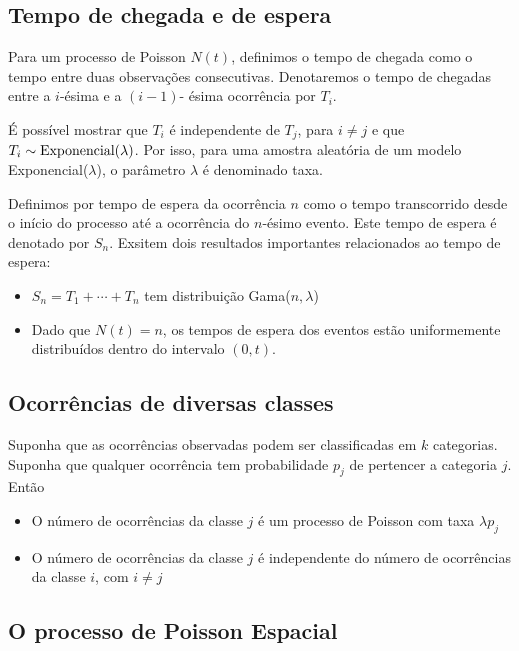 \documentclass[
  letterpaper,
  DIV=11,
  numbers=noendperiod]{scrreprt}
\theoremstyle{definition}
\theoremstyle{plain}
\theoremstyle{definition}
\theoremstyle{remark}
\begin{document}
\subsection{Tempo de chegada e de
espera}\label{tempo-de-chegada-e-de-espera-1}

Para um processo de Poisson \(N(t)\), definimos o tempo de chegada como
o tempo entre duas observações consecutivas. Denotaremos o tempo de
chegadas entre a \(i\)-ésima e a \((i-1)\)- ésima ocorrência por
\(T_i\).

É possível mostrar que \(T_i\) é independente de \(T_j\), para
\(i\neq j\) e que \(T_i\sim\hbox{Exponencial}(\lambda)\). Por isso, para
uma amostra aleatória de um modelo Exponencial(\(\lambda\)), o parâmetro
\(\lambda\) é denominado taxa.

Definimos por tempo de espera da ocorrência \(n\) como o tempo
transcorrido desde o início do processo até a ocorrência do \(n\)-ésimo
evento. Este tempo de espera é denotado por \(S_n\). Exsitem dois
resultados importantes relacionados ao tempo de espera:

\begin{itemize}
\item
  \(S_n=T_1+\cdots+T_n\) tem distribuição Gama(\(n,\lambda\))
\item
  Dado que \(N(t)=n\), os tempos de espera dos eventos estão
  uniformemente distribuídos dentro do intervalo \((0,t)\).
\end{itemize}

\subsection{Ocorrências de diversas
classes}\label{ocorruxeancias-de-diversas-classes-1}

Suponha que as ocorrências observadas podem ser classificadas em \(k\)
categorias. Suponha que qualquer ocorrência tem probabilidade \(p_j\) de
pertencer a categoria \(j\). Então

\begin{itemize}
\item
  O número de ocorrências da classe \(j\) é um processo de Poisson com
  taxa \(\lambda p_j\)
\item
  O número de ocorrências da classe \(j\) é independente do número de
  ocorrências da classe \(i\), com \(i\neq j\)
\end{itemize}

\subsection{O processo de Poisson
Espacial}\label{o-processo-de-poisson-espacial-1}
\end{document}
